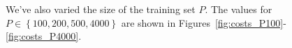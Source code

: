 

We've also varied the size of the training set \(P\).
The values for \( P \in \left\{100, 200, 500, 4000\right\}\) are shown in Figures~\ref{fig:costs_P100}-\ref{fig:costs_P4000}.

